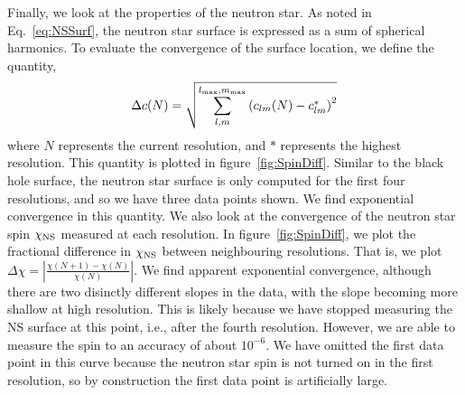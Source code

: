 Finally, we look at the properties of the neutron star. As noted in Eq.~\ref{eq:NSSurf},
the neutron star surface is expressed as a sum of spherical
harmonics.
To evaluate the convergence of the surface location, we define the
quantity,
\begin{equation}
\label{eq:NSSurf2}
\Delta c(N)=\sqrt{\sum_{l,m}^{l_{\rm max},m_{\rm max}}\left(c_{lm}(N)-c^{*}_{lm}\right)^2}
\end{equation}
where $N$ represents the current resolution, and $*$ represents the
highest resolution. This quantity is plotted in
figure~\ref{fig:SpinDiff}. Similar to the black hole surface, the
neutron star surface is only computed for the first four resolutions,
and so we have three data points shown. We find exponential
convergence in this quantity. We also look at the convergence of the
neutron star spin $\chi_{\rm NS}$ measured at each resolution. In
figure~\ref{fig:SpinDiff}, we plot the fractional difference in
$\chi_{\rm NS}$ between neighbouring resolutions. That is, we plot
$
\Delta\chi=|\frac{\chi(N+1)-\chi(N)}{\chi(N)}|.
$
 We find apparent
exponential convergence, although there are two disinctly different
slopes in the data, with the slope becoming more shallow at high
resolution. This is likely because we have stopped measuring the NS
surface at this point, i.e., after the fourth resolution. However, we are able to measure the spin to an
accuracy of about $10^{-6}$. 
 We have omitted the first data point in this curve
because the neutron star spin is not turned on in the first
resolution, so by construction the first data point is artificially large.

